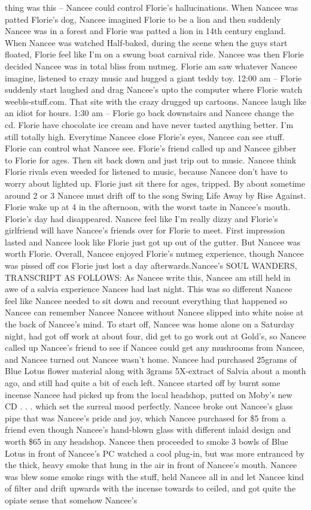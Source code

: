 \documentclass[12pt]{book}
\begin{document}
thing was this -- Nancee could control Florie's hallucinations. When Nancee was patted Florie's dog, Nancee imagined Florie to be a lion and then suddenly Nancee was in a forest and Florie was patted a lion in 14th century england. When Nancee was watched Half-baked, during the scene when the guys start floated, Florie feel like I'm on a swung boat carnival ride. Nancee was then Florie decided Nancee was in total bliss from nutmeg. Florie am saw whatever Nancee imagine, listened to crazy music and hugged a giant teddy toy. 12:00 am -- Florie suddenly start laughed and drag Nancee's upto the computer where Florie watch weebls-stuff.com. That site with the crazy drugged up cartoons. Nancee laugh like an idiot for hours. 1:30 am -- Florie go back downstairs and Nancee change the cd. Florie have chocolate ice cream and have never tasted anything better. I'm still totally high. Everytime Nancee close Florie's eyes, Nancee can see stuff. Florie can control what Nancee see. Florie's friend called up and Nancee gibber to Florie for ages. Then sit back down and just trip out to music. Nancee think Florie rivals even weeded for listened to music, because Nancee don't have to worry about lighted up. Florie just sit there for ages, tripped. By about sometime around 2 or 3 Nancee must drift off to the song Swing Life Away by Rise Against. Florie wake up at 4 in the afternoon, with the worst taste in Nancee's mouth. Florie's day had disappeared. Nancee feel like I'm really dizzy and Florie's girlfriend will have Nancee's friends over for Florie to meet. First impression lasted and Nancee look like Florie just got up out of the gutter. But Nancee was worth Florie. Overall, Nancee enjoyed Florie's nutmeg experience, though Nancee was pissed off cos Florie just lost a day afterwards.Nancee's SOUL WANDERS, TRANSCRIPT AS FOLLOWS: As Nancee write this, Nancee am still held in awe of a salvia experience Nancee had last night. This was so different Nancee feel like Nancee needed to sit down and recount everything that happened so Nancee can remember Nancee Nancee without Nancee slipped into white noise at the back of Nancee's mind. To start off, Nancee was home alone on a Saturday night, had got off work at about four, did get to go work out at Gold's, so Nancee called up Nancee's friend to see if Nancee could get any mushrooms from Nancee, and Nancee turned out Nancee wasn't home. Nancee had purchased 25grams of Blue Lotus flower material along with 3grams 5X-extract of Salvia about a month ago, and still had quite a bit of each left. Nancee started off by burnt some incense Nancee had picked up from the local headshop, putted on Moby's new CD  . . .  which set the surreal mood perfectly. Nancee broke out Nancee's glass pipe that was Nancee's pride and joy, which Nancee purchased for \$5 from a friend even though Nancee's hand-blown glass with different inlaid design and worth \$65 in any headshop. Nancee then proceeded to smoke 3 bowls of Blue Lotus in front of Nancee's PC watched a cool plug-in, but was more entranced by the thick, heavy smoke that hung in the air in front of Nancee's mouth. Nancee was blew some smoke rings with the stuff, held Nancee all in and let Nancee kind of filter and drift upwards with the incense towards to ceiled, and got quite the opiate sense that somehow Nancee's 
\end{document}
